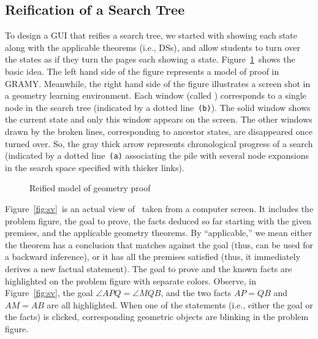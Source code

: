 \subsection{Reification of a Search Tree}

To design a GUI that reifies a search tree, we started with showing each
state along with the applicable theorems (i.e., DSs), and allow students
to turn over the states as if they turn the pages each showing a state.
Figure~\ref{fig:bi}~shows the basic idea.  The left hand side of the
figure represents a model of proof in GRAMY\@.  Meanwhile, the right
hand side of the figure illustrates a screen shot in a geometry learning
environment.  Each window (called \StateView) corresponds to a single
node in the search tree (indicated by a dotted line~\texttt{(b)}).  The
solid window shows the current state and only this window appears on the
screen.  The other windows drawn by the broken lines, corresponding to
ancestor states, are disappeared once turned over.  So, the gray thick
arrow represents chronological progress of a search (indicated by a
dotted line~\texttt{(a)} associating the pile with several node
expansions in the search space specified with thicker links).

\begin{figure}[tb]
 \center
 \caption{Reified model of geometry proof}
 \label{fig:bi}
\end{figure}

Figure~\ref{fig:sv}~is an actual view of \StateView\ taken from a
computer screen.  It includes the problem figure, the goal to prove, the
facts deduced so far starting with the given premises, and the
applicable geometry theorems.  By ``applicable,'' we mean either the
theorem has a conclusion that matches against the goal (thus, can be
used for a backward inference), or it has all the premises satisfied
(thus, it immediately derives a new factual statement).  The goal to
prove and the known facts are highlighted on the problem figure with
separate colors.  Observe, in Figure~\ref{fig:sv}, the goal $\angle APQ
= \angle MQB$, and the two facts $AP = QB$ and $AM = AB$ are all
highlighted.  When one of the statements (i.e., either the goal or the
facts) is clicked, corresponding geometric objects are blinking in the
problem figure.

